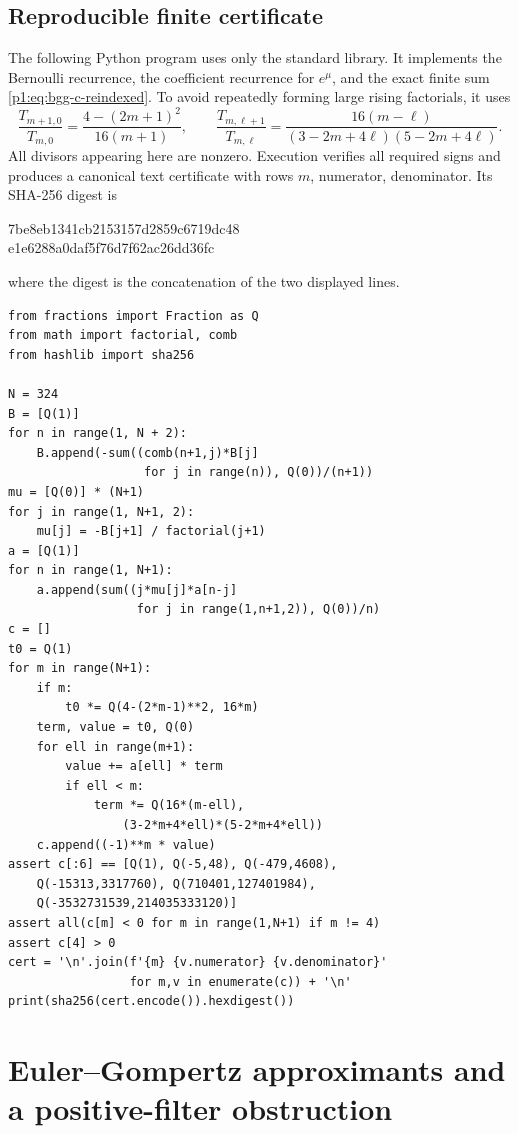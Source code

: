 \documentclass[11pt,a4paper]{article}
\theoremstyle{definition}
\theoremstyle{remark}
\numberwithin{equation}{section}
\begin{document}
\subsection{Reproducible finite certificate}
The following Python program uses only the standard library. It implements
the Bernoulli recurrence, the coefficient recurrence for $e^\mu$, and the
exact finite sum \eqref{p1:eq:bgg-c-reindexed}. To avoid repeatedly forming
large rising factorials, it uses
\[
 \frac{T_{m+1,0}}{T_{m,0}}=
 \frac{4-(2m+1)^2}{16(m+1)},\qquad
 \frac{T_{m,\ell+1}}{T_{m,\ell}}=
 \frac{16(m-\ell)}{(3-2m+4\ell)(5-2m+4\ell)}.
\]
All divisors appearing here are nonzero. Execution verifies all required
signs and produces a canonical text certificate with rows
$m$, numerator, denominator. Its SHA-256 digest is
\begin{center}\ttfamily\small
7be8eb1341cb2153157d2859c6719dc48\\
e1e6288a0daf5f76d7f62ac26dd36fc
\end{center}
where the digest is the concatenation of the two displayed lines.
\begin{lstlisting}
from fractions import Fraction as Q
from math import factorial, comb
from hashlib import sha256

N = 324
B = [Q(1)]
for n in range(1, N + 2):
    B.append(-sum((comb(n+1,j)*B[j]
                   for j in range(n)), Q(0))/(n+1))
mu = [Q(0)] * (N+1)
for j in range(1, N+1, 2):
    mu[j] = -B[j+1] / factorial(j+1)
a = [Q(1)]
for n in range(1, N+1):
    a.append(sum((j*mu[j]*a[n-j]
                  for j in range(1,n+1,2)), Q(0))/n)
c = []
t0 = Q(1)
for m in range(N+1):
    if m:
        t0 *= Q(4-(2*m-1)**2, 16*m)
    term, value = t0, Q(0)
    for ell in range(m+1):
        value += a[ell] * term
        if ell < m:
            term *= Q(16*(m-ell),
                (3-2*m+4*ell)*(5-2*m+4*ell))
    c.append((-1)**m * value)
assert c[:6] == [Q(1), Q(-5,48), Q(-479,4608),
    Q(-15313,3317760), Q(710401,127401984),
    Q(-3532731539,214035333120)]
assert all(c[m] < 0 for m in range(1,N+1) if m != 4)
assert c[4] > 0
cert = '\n'.join(f'{m} {v.numerator} {v.denominator}'
                 for m,v in enumerate(c)) + '\n'
print(sha256(cert.encode()).hexdigest())
\end{lstlisting}


\section{Euler--Gompertz approximants and a positive-filter obstruction}
\label{p1:sec:gompertz-filter}
\end{document}
